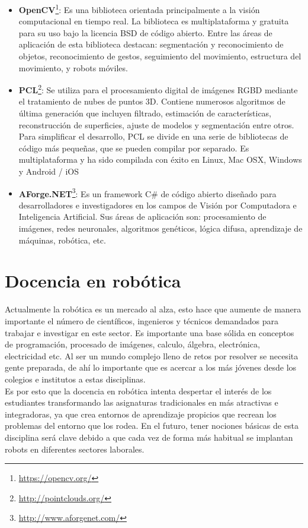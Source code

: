 \begin{itemize}
\item \textbf{OpenCV}\footnote{\url{https://opencv.org/}}: Es una biblioteca orientada principalmente a la visión computacional en tiempo real. La biblioteca es multiplataforma y gratuita para su uso bajo la licencia BSD de código abierto. Entre las áreas de aplicación de esta biblioteca destacan: segmentación y reconocimiento de objetos, reconocimiento de gestos, seguimiento del movimiento, estructura del movimiento,  y robots móviles.
\item \textbf{PCL}\footnote{\url{http://pointclouds.org/}}: Se utiliza para el procesamiento digital de imágenes RGBD mediante el tratamiento de nubes de puntos 3D. Contiene numerosos algoritmos de última generación que incluyen filtrado, estimación de características, reconstrucción de superficies, ajuste de modelos y segmentación entre otros. Para simplificar el desarrollo, PCL se divide en una serie de bibliotecas de código más pequeñas, que se pueden compilar por separado. Es multiplataforma y ha sido compilada con éxito en Linux, Mac OSX, Windows y Android / iOS
\item \textbf{AForge.NET}\footnote{\url{http://www.aforgenet.com/}}: Es un framework C\# de código abierto diseñado para desarrolladores e investigadores en los campos de Visión por Computadora e Inteligencia Artificial. Sus áreas de aplicación son: procesamiento de imágenes, redes neuronales, algoritmos genéticos, lógica difusa, aprendizaje de máquinas, robótica, etc.
\end{itemize}

\section{Docencia en robótica}

Actualmente la robótica es un mercado al alza, esto hace que aumente de manera importante el número de científicos, ingenieros y técnicos demandados para trabajar e investigar en este sector.
Es importante una base sólida en conceptos de programación, procesado de imágenes, calculo, álgebra, electrónica, electricidad etc. Al ser un mundo complejo lleno de retos por resolver se necesita gente preparada, de ahí lo importante que es acercar a los más jóvenes desde los colegios e institutos a estas disciplinas.\\

Es por esto que la docencia en robótica intenta despertar el interés de los estudiantes transformando las asignaturas tradicionales en más atractivas e integradoras, ya que crea entornos de aprendizaje propicios que recrean los problemas del entorno que los rodea. En el futuro, tener nociones básicas de esta disciplina será clave debido a que cada vez de forma más habitual se implantan robots en diferentes sectores laborales.\\

